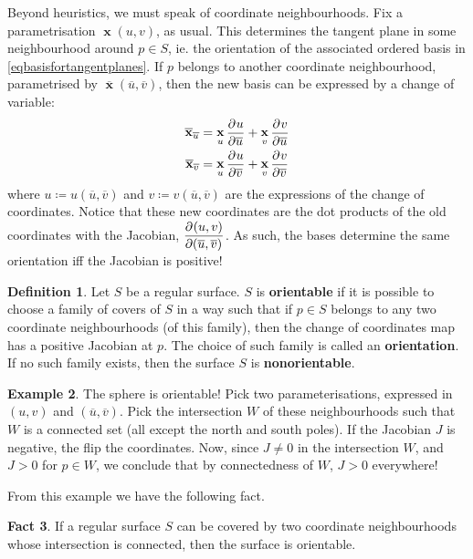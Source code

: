 \documentclass{amsart} %
\theoremstyle{mytheoremstyle}
\theoremstyle{definition}
\newtheorem{definition}{Definition}[section]
\newtheorem{example}[definition]{Example}
\newtheorem{fact}[definition]{Fact}
\numberwithin{equation}{section}
\DeclareMathOperator{\1}{\mathbbm{1}}
\DeclareMathOperator{\x}{\mathbf{x}}
\begin{document}
Beyond heuristics, we must speak of coordinate neighbourhoods. Fix a parametrisation $\x(u,v)$, as usual. This determines the tangent plane in some neighbourhood around $p \in S$, ie. the orientation of the associated ordered basis in \eqref{eqbasisfortangentplanes}. If $p$ belongs to another coordinate neighbourhood, parametrised by $\overline{\x}(\overline{u},\overline{v})$, then the new basis can be expressed by a change of variable:
\begin{align*}
	\overline{\x}_{\overline{u}} &= \x_u \dpd{u}{\overline{u}} + \x_v \dpd{v}{\overline{u}} \\
	\overline{\x}_{\overline{v}} &= \x_u \dpd{u}{\overline{v}} + \x_v \dpd{v}{\overline{v}}
\end{align*}
where $u \coloneqq u(\overline{u},\overline{v})$ and $v \coloneqq v(\overline{u},\overline{v})$ are the expressions of the change of coordinates. Notice that these new coordinates are the dot products of the old coordinates with the Jacobian, $\dpd{(u,v)}{(\overline{u},\overline{v})}$. As such, the bases determine the same orientation iff the Jacobian is positive!

\begin{definition}
	\label{deforientation}
	Let $S$ be a regular surface. $S$ is \textbf{orientable} if it is possible to choose a family of covers of $S$ in a way such that if $p \in S$ belongs to any two coordinate neighbourhoods (of this family), then the change of coordinates map has a positive Jacobian at $p$. The choice of such family is called an \textbf{orientation}. If no such family exists, then the surface $S$ is \textbf{nonorientable}.
\end{definition}

\begin{example}
	\label{examplesphereisorientable}
	The sphere is orientable! Pick two parameterisations, expressed in $(u,v)$ and $(\overline{u},\overline{v})$. Pick the intersection $W$ of these neighbourhoods such that $W$ is a connected set (all except the north and south poles). If the Jacobian $J$ is negative, the flip the coordinates. Now, since $J \neq 0$ in the intersection $W$, and $J >0$ for $p \in W$, we conclude that by connectedness of $W$, $J >0$ everywhere!
\end{example}
From this example we have the following fact.

\begin{fact}
	\label{factcharacterisationoforientability}
	If a regular surface $S$ can be covered by two coordinate neighbourhoods whose intersection is connected, then the surface is orientable.
\end{fact}
\end{document}

